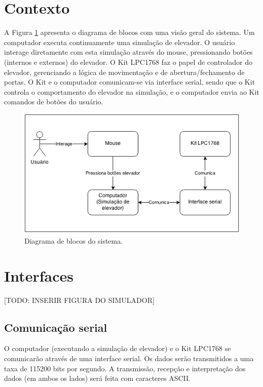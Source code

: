 \section{Contexto}

A Figura \ref{fig:diagrama_blocos} apresenta o diagrama de blocos com uma visão geral do sistema. Um computador executa continuamente uma simulação de elevador. O usuário interage diretamente com esta simulação através do mouse, pressionando botões (internos e externos) do elevador. O Kit LPC1768 faz o papel de controlador do elevador, gerenciando a lógica de movimentação e de abertura/fechamento de portas. O Kit e o computador comunicam-se via interface serial, sendo que o Kit controla o comportamento do elevador na simulação, e o computador envia ao Kit comandos de botões do usuário. 

\begin{figure}[h]
\begin{center}
    \includegraphics[width=0.8\columnwidth]{./figures/diagrama_blocos.png}
    \caption{Diagrama de blocos do sistema.}
    \label{fig:diagrama_blocos}
\end{center}
\end{figure}


\section{Interfaces}
[TODO: INSERIR FIGURA DO SIMULADOR]

\subsection{Comunicação serial}
O computador (executando a simulação de elevador) e o Kit LPC1768 se comunicarão através de uma interface serial. Os dados serão transmitidos a uma taxa de 115200 bits por segundo. A transmissão, recepção e interpretação dos dados (em ambos os lados) será feita com caracteres ASCII.



